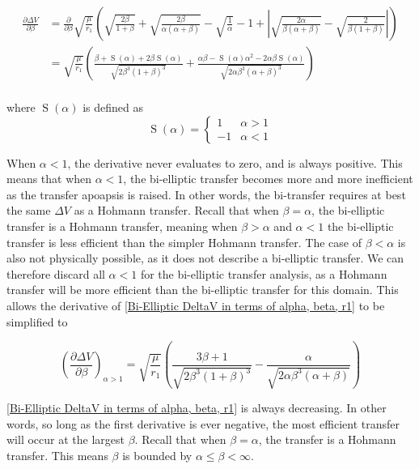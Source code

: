 \documentclass{article}
\begin{document}
\begin{align*}
    \frac{\partial\Delta V}{\partial\beta} & = \frac{\partial}{\partial\beta}\sqrt{\frac{\mu}{r_1}}\left(\sqrt{\frac{2\beta}{1+\beta}}+\sqrt{\frac{2\beta}{\alpha(\alpha+\beta)}}-\sqrt{\frac{1}{\alpha}}-1+\left|\sqrt{\frac{2\alpha}{\beta(\alpha+\beta)}}-\sqrt{\frac{2}{\beta(1+\beta)}}\right|\right)         \\
                                           & = \sqrt{\frac{\mu}{r_1}}\left(\frac{\beta+\operatorname{S}(\alpha)+2\beta\operatorname{S}(\alpha)}{\sqrt{2\beta^3(1+\beta)^3}}+\frac{\alpha\beta-\operatorname{S}(\alpha)\alpha^2-2\alpha\beta\operatorname{S}(\alpha)}{\sqrt{2\alpha\beta^3(\alpha+\beta)^3}}\right) \\
\end{align*}

where $\operatorname{S}(\alpha)$ is defined as
\begin{equation*}
    \operatorname{S}(\alpha)=\begin{cases}
        1  & \alpha>1 \\
        -1 & \alpha<1
    \end{cases}
\end{equation*}

When $\alpha<1$, the derivative never evaluates to zero, and is always positive. This means that when $\alpha<1$, the bi-elliptic transfer becomes more and more inefficient as the transfer apoapsis is raised. In other words, the bi-transfer requires at best the same $\Delta V$ as a Hohmann transfer. Recall that when $\beta=\alpha$, the bi-elliptic transfer is a Hohmann transfer, meaning when $\beta>\alpha$ and $\alpha<1$ the bi-elliptic transfer is less efficient than the simpler Hohmann transfer. The case of $\beta<\alpha$ is also not physically possible, as it does not describe a bi-elliptic transfer. We can therefore discard all $\alpha<1$ for the bi-elliptic transfer analysis, as a Hohmann transfer will be more efficient than the bi-elliptic transfer for this domain. This allows the derivative of \eqref{Bi-Elliptic DeltaV in terms of alpha, beta, r1} to be simplified to

\begin{equation}\label{Bielliptic DV derivative}
    \left(\frac{\partial\Delta V}{\partial\beta}\right)_{\alpha>1} = \sqrt{\frac{\mu}{r_1}}\left(\frac{3\beta+1}{\sqrt{2\beta^3(1+\beta)^3}}-\frac{\alpha}{\sqrt{2\alpha\beta^3(\alpha+\beta)}}\right)
\end{equation}

\eqref{Bi-Elliptic DeltaV in terms of alpha, beta, r1} is always decreasing. In other words, so long as the first derivative is ever negative, the most efficient transfer will occur at the largest $\beta$. Recall that when $\beta=\alpha$, the transfer is a Hohmann transfer. This means $\beta$ is bounded by $\alpha\leq\beta<\infty$.
\end{document}
